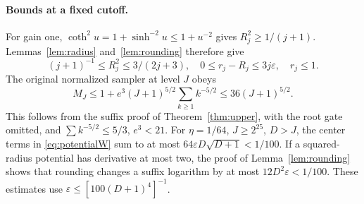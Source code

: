 \paragraph{Bounds at a fixed cutoff.}
For gain one, $\coth^2u=1+\sinh^{-2}u\le1+u^{-2}$ gives
$R_j^2\ge1/(j+1)$.  Lemmas~\ref{lem:radius} and~\ref{lem:rounding}
therefore give
\[
 (j+1)^{-1}\le R_j^2\le3/(2j+3),\quad
 0\le r_j-R_j\le3j\varepsilon,\quad r_j\le1.
\]
The original normalized sampler at level $J$ obeys
\begin{equation}\label{eq:normalizedcutoff}
 M_J\le1+e^3(J+1)^{5/2}\sum_{k\ge1}k^{-5/2}
 \le36(J+1)^{5/2}.
\end{equation}
This follows from the suffix proof of Theorem~\ref{thm:upper},
with the root gate omitted, and $\sum k^{-5/2}\le5/3$, $e^3<21$.
For $\eta=1/64$, $J\ge2^{25}$, $D>J$, the center terms in
\eqref{eq:potentialW} sum to at most
$64\varepsilon D\sqrt{D+1}<1/100$. If a squared-radius potential
has derivative at most two, the proof of Lemma~\ref{lem:rounding}
shows that rounding changes a suffix logarithm
by at most $12D^2\varepsilon<1/100$. These estimates use
$\varepsilon\le[100(D+1)^4]^{-1}$.
